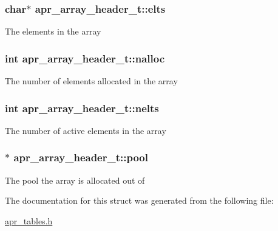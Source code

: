 \subsubsection[{\texorpdfstring{elts}{elts}}]{\setlength{\rightskip}{0pt plus 5cm}char$\ast$ apr\+\_\+array\+\_\+header\+\_\+t\+::elts}\hypertarget{structapr__array__header__t_af8462fa2a1ddf6406c66cd3dd441a269}{}\label{structapr__array__header__t_af8462fa2a1ddf6406c66cd3dd441a269}
The elements in the array 
\subsubsection[{\texorpdfstring{nalloc}{nalloc}}]{\setlength{\rightskip}{0pt plus 5cm}int apr\+\_\+array\+\_\+header\+\_\+t\+::nalloc}\hypertarget{structapr__array__header__t_a0ceb78a23ebef1bceea5f0cd3e1513b6}{}\label{structapr__array__header__t_a0ceb78a23ebef1bceea5f0cd3e1513b6}
The number of elements allocated in the array 
\subsubsection[{\texorpdfstring{nelts}{nelts}}]{\setlength{\rightskip}{0pt plus 5cm}int apr\+\_\+array\+\_\+header\+\_\+t\+::nelts}\hypertarget{structapr__array__header__t_ab11b88220885c5a0920a06ac85680055}{}\label{structapr__array__header__t_ab11b88220885c5a0920a06ac85680055}
The number of active elements in the array 
\subsubsection[{\texorpdfstring{pool}{pool}}]{$\ast$ apr\+\_\+array\+\_\+header\+\_\+t\+::pool}\hypertarget{structapr__array__header__t_a68f353ce65943172fcc9494aa9f6e424}{}\label{structapr__array__header__t_a68f353ce65943172fcc9494aa9f6e424}
The pool the array is allocated out of 

The documentation for this struct was generated from the following file\+:\begin{DoxyCompactItemize}
\item 
\hyperlink{apr__tables_8h}{apr\+\_\+tables.\+h}\end{DoxyCompactItemize}
